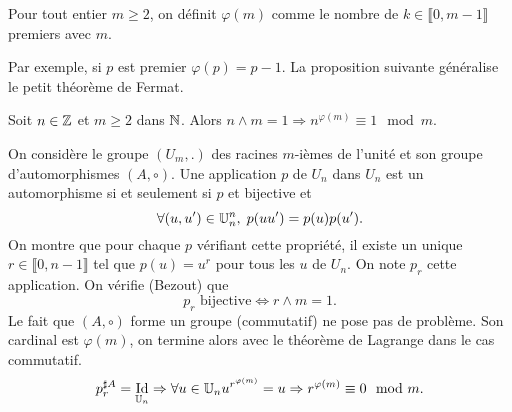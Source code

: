 \begin{defi}
 Pour tout entier $m\geq 2$, on définit $\varphi(m)$ comme le nombre de $k\in \llbracket 0, m-1\rrbracket$ premiers avec $m$.
\end{defi}
Par exemple, si $p$ est premier $\varphi(p) = p-1$. La proposition suivante généralise le petit théorème de Fermat.
\begin{prop}
 Soit $n\in \mathbb{Z}$ et $m\geq 2$ dans $\mathbb{N}$. Alors $ n\wedge m = 1 \Rightarrow n^{\varphi(m)} \equiv 1 \mod m$.
\end{prop}
\begin{demo}
 On considère le groupe $(U_m,.)$ des racines $m$-ièmes de l'unité et son groupe d'automorphismes $(A,\circ)$.\newline
 Une application $p$ de $U_n$ dans $U_n$ est un automorphisme si et seulement si $p$ et bijective et
 \[
  \forall(u,u') \in \mathbb{U}_n^n,\; p(uu') = p(u)p(u').
 \]
On montre que pour chaque $p$ vérifiant cette propriété, il existe un unique $r\in \llbracket 0, n-1\rrbracket$ tel que $p(u) = u^r$ pour tous les $u$ de $U_n$. On note $p_r$ cette application. On vérifie (Bezout) que 
\[
 p_r \text{ bijective} \Leftrightarrow r \wedge m = 1.
\]
Le fait que $(A,\circ)$ forme un groupe (commutatif) ne pose pas de problème. Son cardinal est $\varphi(m)$, on termine alors avec le théorème de Lagrange dans le cas commutatif.
\[
 p_r^{\sharp A} = \mathop{\mathrm{Id}}_{\mathbb{U}_n} \Rightarrow \forall u \in \mathbb{U}_n u^{r^{\varphi(m)}} = u
 \Rightarrow r^{\varphi(m)} \equiv 0 \mod m.
\]

\end{demo}





